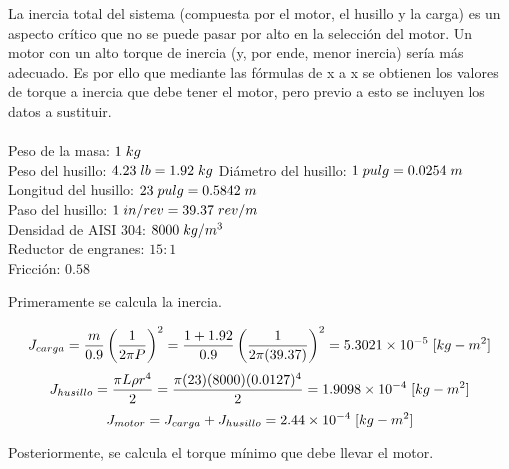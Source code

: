 \documentclass[14pt,oneside]{extarticle} %
\begin{document}
La inercia total del sistema (compuesta por el motor, el husillo y la carga) es un aspecto crítico que no se puede pasar por alto en la selección del motor. Un motor con un alto torque de inercia (y, por ende, menor inercia) sería más adecuado. Es por ello que mediante las fórmulas de x a x se obtienen los valores de torque a inercia que debe tener el motor, pero previo a esto se incluyen los datos a sustituir.\\\\
Peso de la masa: $1\hspace{0.1cm}kg$\\
Peso del husillo: $4.23\hspace{0.1cm}lb=1.92\hspace{0.1cm}kg$
Diámetro del husillo: $1\hspace{0.1cm}pulg=0.0254\hspace{0.1cm}m$\\
Longitud del husillo: $23\hspace{0.1cm}pulg=0.5842\hspace{0.1cm}m$\\
Paso del husillo: $1\hspace{0.1cm}in/rev=39.37\hspace{0.1cm}rev/m$\\
Densidad de AISI 304: $8000\hspace{0.1cm}kg/m^3$\\
Reductor de engranes: $15:1$\\
Fricción: $0.58$

Primeramente se calcula la inercia.

\begin{equation*}
    J_{carga}=\frac{m}{0.9}\left(\frac{1}{2\pi P}\right)^2=\frac{1+1.92}{0.9}\left(\frac{1}{2\pi (39.37)}\right)^2=5.3021\times10^{-5}\hspace{0.1cm}[kg-m^2]
\end{equation*}
\begin{equation*}
    J_{husillo}=\frac{\pi L\rho r^4}{2}=\frac{\pi (23)(8000)(0.0127)^4}{2}=1.9098\times10^{-4}\hspace{0.1cm}[kg-m^2]
\end{equation*}
\begin{equation*}
    J_{motor}=J_{carga}+J_{husillo}=2.44\times10^{-4}\hspace{0.1cm}[kg-m^2]
\end{equation*}

\newpage

Posteriormente, se calcula el torque mínimo que debe llevar el motor.
\end{document}
